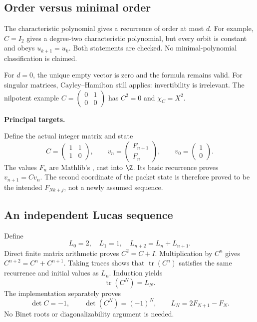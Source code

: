 \subsection*{Order versus minimal order}
The characteristic polynomial gives a recurrence of order at most $d$. For example, $C=I_2$ gives a degree-two characteristic polynomial, but every orbit is constant and obeys $u_{k+1}=u_k$. Both statements are checked. No minimal-polynomial classification is claimed.

For $d=0$, the unique empty vector is zero and the formula remains valid. For singular matrices, Cayley--Hamilton still applies: invertibility is irrelevant. The nilpotent example $C=\left(\begin{smallmatrix}0&1\\0&0\end{smallmatrix}\right)$ has $C^2=0$ and $\chi_C=X^2$.

\textbf{Principal targets.}\par
{}\par
{}\par
{}\par
{}\par
{}
\par\medskip
{}
Define the actual integer matrix and state
\[
 C=\begin{pmatrix}1&1\\1&0\end{pmatrix},
 \qquad v_n=\begin{pmatrix}F_{n+1}\\F_n\end{pmatrix},
 \qquad v_0=\begin{pmatrix}1\\0\end{pmatrix}.
\]
The values $F_n$ are Mathlib's , cast into $\Z$. Its basic recurrence proves $v_{n+1}=Cv_n$. The second coordinate of the packet state is therefore proved to be the intended $F_{Nk+j}$, not a newly assumed sequence.

\subsection*{An independent Lucas sequence}
Define
\[
 L_0=2,\quad L_1=1,\quad L_{n+2}=L_n+L_{n+1}.
\]
Direct finite matrix arithmetic proves $C^2=C+I$. Multiplication by $C^n$ gives $C^{n+2}=C^n+C^{n+1}$. Taking traces shows that $\operatorname{tr}(C^n)$ satisfies the same recurrence and initial values as $L_n$. Induction yields
\[
 \boxed{\operatorname{tr}(C^N)=L_N.}
\]
The implementation separately proves
\[
 \det C=-1,\qquad \det(C^N)=(-1)^N,
 \qquad L_N=2F_{N+1}-F_N.
\]
No Binet roots or diagonalizability argument is needed.

